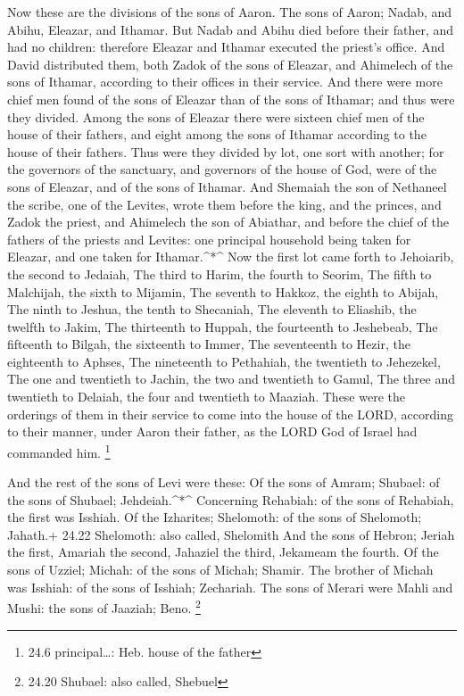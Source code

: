  Now these are the divisions of the sons of Aaron. The sons
of Aaron; Nadab, and Abihu, Eleazar, and Ithamar.  But Nadab
and Abihu died before their father, and had no children: therefore
Eleazar and Ithamar executed the priest's office.  And David
distributed them, both Zadok of the sons of Eleazar, and Ahimelech of
the sons of Ithamar, according to their offices in their service.
 And there were more chief men found of the sons of Eleazar
than of the sons of Ithamar; and thus were they divided. Among the sons
of Eleazar there were sixteen chief men of the house of their fathers,
and eight among the sons of Ithamar according to the house of their
fathers.  Thus were they divided by lot, one sort with
another; for the governors of the sanctuary, and governors of the house
of God, were of the sons of Eleazar, and of the sons of Ithamar.
 And Shemaiah the son of Nethaneel the scribe, one of the
Levites, wrote them before the king, and the princes, and Zadok the
priest, and Ahimelech the son of Abiathar, and before the chief of the
fathers of the priests and Levites: one principal household being taken
for Eleazar, and one taken for Ithamar.\^{}*\^{}  Now the
first lot came forth to Jehoiarib, the second to Jedaiah, 
The third to Harim, the fourth to Seorim,  The fifth to
Malchijah, the sixth to Mijamin,  The seventh to Hakkoz,
the eighth to Abijah,  The ninth to Jeshua, the tenth to
Shecaniah,  The eleventh to Eliashib, the twelfth to Jakim,
 The thirteenth to Huppah, the fourteenth to Jeshebeab,
 The fifteenth to Bilgah, the sixteenth to Immer,
 The seventeenth to Hezir, the eighteenth to Aphses,
 The nineteenth to Pethahiah, the twentieth to Jehezekel,
 The one and twentieth to Jachin, the two and twentieth to
Gamul,  The three and twentieth to Delaiah, the four and
twentieth to Maaziah.  These were the orderings of them in
their service to come into the house of the LORD, according to their
manner, under Aaron their father, as the LORD God of Israel had
commanded him. \footnote{24.6 principal\ldots: Heb. house of the father}

 And the rest of the sons of Levi were these: Of the sons
of Amram; Shubael: of the sons of Shubael; Jehdeiah.\^{}*\^{}
 Concerning Rehabiah: of the sons of Rehabiah, the first
was Isshiah.  Of the Izharites; Shelomoth: of the sons of
Shelomoth; Jahath.+ 24.22 Shelomoth: also called, Shelomith
 And the sons of Hebron; Jeriah the first, Amariah the
second, Jahaziel the third, Jekameam the fourth.  Of the
sons of Uzziel; Michah: of the sons of Michah; Shamir.  The
brother of Michah was Isshiah: of the sons of Isshiah; Zechariah.
 The sons of Merari were Mahli and Mushi: the sons of
Jaaziah; Beno. \footnote{24.20 Shubael: also called, Shebuel}

